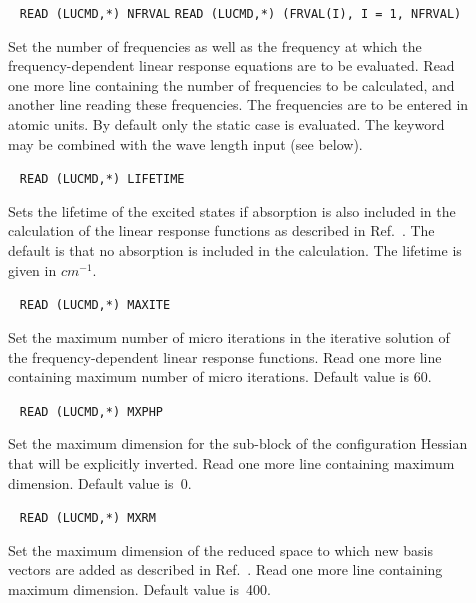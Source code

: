 \begin{description}
\item[]\verb| |\newline
\verb|READ (LUCMD,*) NFRVAL|\newline
\verb|READ (LUCMD,*) (FRVAL(I), I = 1, NFRVAL)|

Set the number of frequencies as well as the
frequency at which the
frequency-dependent linear response equations are to be evaluated.
Read one more line containing the number of frequencies to be
calculated, and another line reading these frequencies. The
frequencies are to be entered in atomic units. By default only the
static case is evaluated.
The  keyword may be combined with the wave length input
 (see below).

\item[]\verb| |\newline
\verb|READ (LUCMD,*) LIFETIME|

Sets the lifetime of the excited states if absorption is also included
in the calculation of the linear response functions as described in
Ref.~\cite{pndmbhjajjojcp115,pnkrthjcp120}. The default is that no
absorption is included in the calculation. The lifetime is given in
$cm^{-1}$. 

\item[]\verb| |\newline
\verb|READ (LUCMD,*) MAXITE|

Set the maximum number of micro iterations in the iterative solution of
the frequency-dependent linear response functions. Read one more line
containing maximum number of micro iterations. Default value is
60.

\item[]\verb| |\newline
\verb|READ (LUCMD,*) MXPHP|

Set the maximum dimension for the sub-block of the configuration
Hessian that will be explicitly inverted. Read one more line
containing maximum dimension. Default value is~0.

\item[]\verb| |\newline
\verb|READ (LUCMD,*) MXRM|

Set the maximum dimension of the reduced space to which new basis
vectors are added as described in Ref.~\cite{tuhjahjajpjjcp84}. Read
one more line containing maximum dimension. Default value is~400.


\end{description}
